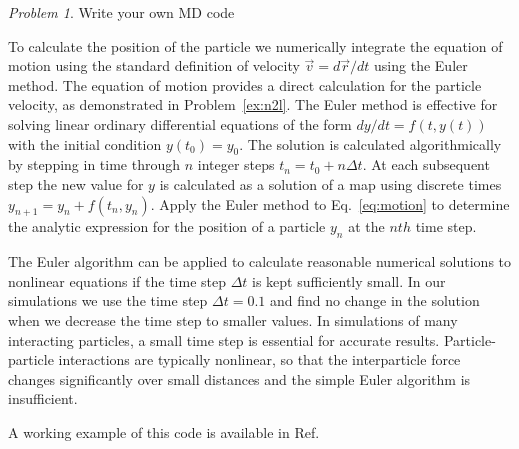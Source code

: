 \documentclass[preprint,showpacs,preprintnumbers,amsmath,amssymb,aps,prb]{revtex4-1}
\theoremstyle{remark}
\newtheorem{problem}{Problem}
\begin{document}
\begin{problem}{Write your own MD code}
  \label{ex:euler}

  To calculate the position of the particle we
  numerically integrate the equation of motion using
  the standard definition of velocity
  $\vec{v} = d\vec{r}/dt$ 
  using the 
  Euler method. 
  The equation of motion provides
  a direct calculation for the particle velocity,
  as demonstrated in Problem~\ref{ex:n2l}.  
  The Euler method is effective for solving linear ordinary differential  equations
  of the form
  $dy/dt = f(t,y(t))$ with the initial condition $y(t_0) = y_0$.
  The solution is calculated algorithmically
  by stepping in time through $n$ integer steps
  $t_n = t_0 + n \Delta t$.
  At each subsequent step the new
  value for $y$ is calculated as a  solution of a map using
  discrete times 
  $y_{n+1} = y_n + f(t_n,y_n)$.
  Apply the Euler method to %
  Eq.~\ref{eq:motion}
  to determine  the analytic expression
  for the position of a particle
  $y_n$ at the $nth$ time step.
    
  The Euler algorithm can be applied to
  calculate reasonable numerical solutions to 
  nonlinear
  equations if the time step $\Delta t$
  is kept sufficiently small.\cite{Newman}
  In our simulations we use the time step $\Delta t = 0.1$
  and find no change in the solution
  when we decrease the time step to smaller values.
  In simulations of
  many interacting particles,
  a small
  time step is essential for accurate results.
  Particle-particle interactions are typically nonlinear,
  so that the interparticle force changes significantly over small distances and the simple Euler algorithm is insufficient.

  A working example of this code is available
  in Ref.~\cite{supplemental}
  
\end{problem}
\end{document}
